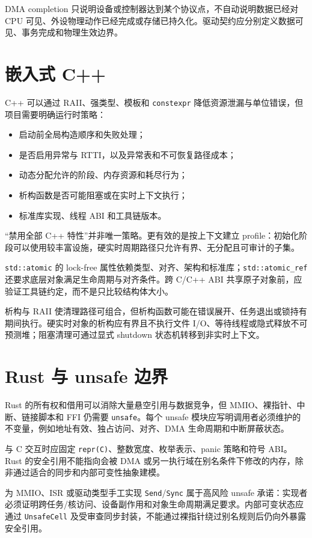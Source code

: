 DMA completion 只说明设备或控制器达到某个协议点，不自动说明数据已经对 CPU 可见、外设物理动作已经完成或存储已持久化。驱动契约应分别定义数据可见、事务完成和物理生效边界。

\section{嵌入式 C++}

C++ 可以通过 RAII、强类型、模板和 \texttt{constexpr} 降低资源泄漏与单位错误，但项目需要明确运行时策略：
\begin{itemize}
  \item 启动前全局构造顺序和失败处理；
  \item 是否启用异常与 RTTI，以及异常表和不可恢复路径成本；
  \item 动态分配允许的阶段、内存资源和耗尽行为；
  \item 析构函数是否可能阻塞或在实时上下文执行；
  \item 标准库实现、线程 ABI 和工具链版本。
\end{itemize}

“禁用全部 C++ 特性”并非唯一策略。更有效的是按上下文建立 profile：初始化阶段可以使用较丰富设施，硬实时周期路径只允许有界、无分配且可审计的子集。

\texttt{std::atomic} 的 lock-free 属性依赖类型、对齐、架构和标准库；\texttt{std::atomic\_ref} 还要求底层对象满足生命周期与对齐条件。跨 C/C++ ABI 共享原子对象前，应验证工具链约定，而不是只比较结构体大小。

析构与 RAII 使清理路径可组合，但析构函数可能在错误展开、任务退出或锁持有期间执行。硬实时对象的析构应有界且不执行文件 I/O、等待线程或隐式释放不可预测堆；阻塞清理可通过显式 shutdown 状态机转移到非实时上下文。

\section{Rust 与 unsafe 边界}

Rust 的所有权和借用可以消除大量悬空引用与数据竞争，但 MMIO、裸指针、中断、链接脚本和 FFI 仍需要 \texttt{unsafe}。每个 unsafe 模块应写明调用者必须维护的不变量，例如地址有效、独占访问、对齐、DMA 生命周期和中断屏蔽状态。

与 C 交互时应固定 \texttt{repr(C)}、整数宽度、枚举表示、panic 策略和符号 ABI。Rust 的安全引用不能指向会被 DMA 或另一执行域在别名条件下修改的内存，除非通过适合的同步和内部可变性抽象建模。

为 MMIO、ISR 或驱动类型手工实现 \texttt{Send}/\texttt{Sync} 属于高风险 unsafe 承诺：实现者必须证明跨任务/核访问、设备副作用和对象生命周期满足要求。内部可变状态应通过 \texttt{UnsafeCell} 及受审查同步封装，不能通过裸指针绕过别名规则后仍向外暴露安全引用。


